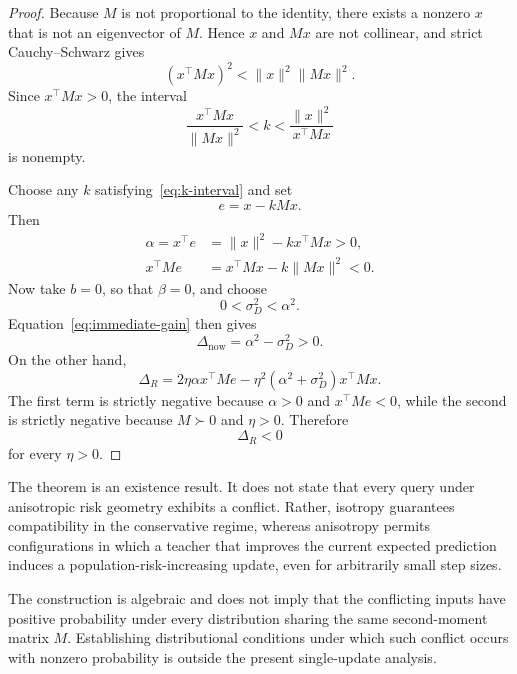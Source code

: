 \begin{proof}
Because $M$ is not proportional to the identity, there exists a nonzero
$x$ that is not an eigenvector of $M$. Hence $x$ and $Mx$ are not
collinear, and strict Cauchy--Schwarz gives
\begin{equation}
    (x^\top Mx)^2
    <
    \|x\|^2\|Mx\|^2.
\end{equation}
Since $x^\top Mx>0$, the interval
\begin{equation}
    \frac{x^\top Mx}{\|Mx\|^2}
    <
    k
    <
    \frac{\|x\|^2}{x^\top Mx}
    \label{eq:k-interval}
\end{equation}
is nonempty.

Choose any $k$ satisfying~\eqref{eq:k-interval} and set
\begin{equation}
    e=x-kMx.
\end{equation}
Then
\begin{align}
    \alpha=x^\top e
    &=\|x\|^2-kx^\top Mx>0,
    \\
    x^\top Me
    &=x^\top Mx-k\|Mx\|^2<0.
\end{align}
Now take $b=0$, so that $\beta=0$, and choose
\begin{equation}
    0<\sigma_D^2<\alpha^2.
\end{equation}
Equation~\eqref{eq:immediate-gain} then gives
\begin{equation}
    \Delta_{\mathrm{now}}
    =\alpha^2-\sigma_D^2>0.
\end{equation}
On the other hand,
\begin{equation}
    \Delta_R
    =
    2\eta\alpha x^\top Me
    -
    \eta^2(\alpha^2+\sigma_D^2)x^\top Mx.
\end{equation}
The first term is strictly negative because
$\alpha>0$ and $x^\top Me<0$, while the second is strictly negative because
$M\succ0$ and $\eta>0$. Therefore
\begin{equation}
    \Delta_R<0
\end{equation}
for every $\eta>0$.
\end{proof}

The theorem is an existence result. It does not state that every query under
anisotropic risk geometry exhibits a conflict. Rather, isotropy guarantees
compatibility in the conservative regime, whereas anisotropy permits
configurations in which a teacher that improves the current expected
prediction induces a population-risk-increasing update, even for
arbitrarily small step sizes.

The construction is algebraic and does not imply that the conflicting
inputs have positive probability under every distribution sharing the same
second-moment matrix $M$. Establishing distributional conditions under which
such conflict occurs with nonzero probability is outside the present
single-update analysis.

